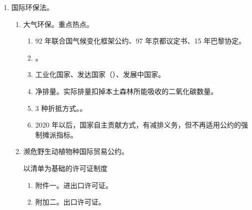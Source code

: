 \begin{enumerate}
        \begin{kk}{外空}
          航空器能到达的高度。
          \begin{enumerate}
            \item 登记制度。联合国秘书长处登记。法律后果：是管辖权和所有权的依据。
            \item 营救制度。。
            \item 责任制度。。
                  \begin{enumerate}
                    \item 空对地绝对责任，空对空过错责任。
                    \item 单方过错单方承担，都有过错按比例，没有过错损失自担。
                    \item 不调整。
                  \end{enumerate}
          \end{enumerate}
        \end{kk}
  \item 国际环保法。
        \begin{enumerate}
          \item 大气环保。重点热点。
                \begin{enumerate}
                  \item 92 年联合国气候变化框架公约、97 年京都议定书、15 年巴黎协定。
                  \item {}。
                  \item 工业化国家、发达国家（）、发展中国家。
                  \item 净排量。实际排量扣掉本土森林所能吸收的二氧化碳数量。
                  \item 3 种折抵方式。。
                  \item 2020 年以后，国家自主贡献方式，有减排义务，但不再适用公约的强制摊派指标。
                \end{enumerate}
          \item 濒危野生动植物种国际贸易公约。
                \begin{kk}{以清单为基础的许可证制度}
                  \begin{enumerate}
                    \item 附件一。进出口许可证。
                    \item 附加二。出口许可证。

\end{enumerate}
\end{kk}
\end{enumerate}
\end{enumerate}
